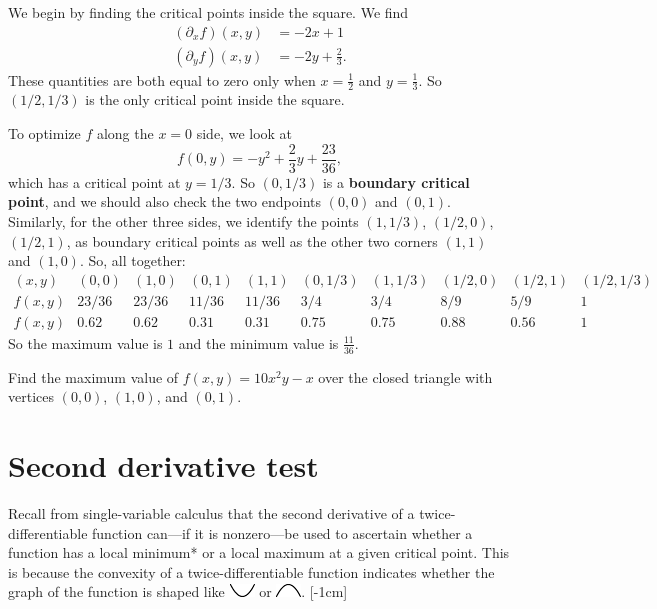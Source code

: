 \documentclass{watsonbook}
\begin{document}
  \begin{solution}
    We begin by finding the critical points inside the square. We find
    \begin{align*}
      (\partial_xf)(x,y) &= -2x + 1  \\
      (\partial_yf)(x,y) &= -2y + \frac{2}{3}. 
    \end{align*}
    These quantities are both equal to zero only when $x =
    \tfrac{1}{2}$ and $y = \frac{1}{3}$. So $(1/2,1/3)$ is the only critical
    point inside the square.

    To optimize $f$ along the $x = 0$ side, we look at
    \[
      f(0,y) = -y^2 + \frac{2}{3}y + \frac{23}{36}, 
    \]
    which has a critical point at $y = 1/3$. So $(0,1/3)$ is a
    \textbf{boundary critical point}, and we should also check the two
    endpoints $(0,0)$ and $(0,1)$. Similarly, for the other three
    sides, we identify the points $(1,1/3)$, $(1/2,0)$, $(1/2,1)$, as
    boundary critical points as well as the other two corners $(1,1)$
    and $(1,0)$. So, all together:
    \[
      \renewcommand\arraystretch{1.4}
      \begin{array}{c|ccccccccc}
       (x,y) &  (0,0) & (1,0) & (0,1) & (1,1) & (0,1/3) & (1,1/3) & (1/2,0) &
                                                                      (1/2,1)
        & (1/2,1/3) \\ \hline
        f(x,y) & 23/36 & 23/36 & 11/36 & 11/36 & 3/4 & 3/4 & 8/9 & 5/9
        & 1 \\
        f(x,y) & 0.62 & 0.62 & 0.31 & 0.31 & 0.75 & 0.75 & 0.88 & 0.56
        & 1
      \end{array}
    \]
    So the maximum value is $\boxed{1}$ and the minimum value is
    $\boxed{\tfrac{11}{36}}$. 
  \end{solution}

  \begin{exercise}{}{}
    Find the maximum value of $f(x,y) = 10x^2y-x$ over the closed
    triangle with vertices $(0,0)$, $(1,0)$, and $(0,1)$.
  \end{exercise}

  \section{Second derivative test} \label{sec:second_test}

  Recall from single-variable calculus that the second derivative of a
  twice-differentiable function can---if it is nonzero---be used to
  ascertain whether a function has a local minimum* or a local maximum
  at a given critical point. This is because the convexity of a
  twice-differentiable function indicates whether the graph of the
  function is shaped like \includegraphics{figures/smallup} or
  \includegraphics{figures/smalldown}. [-1cm]
\end{document}
